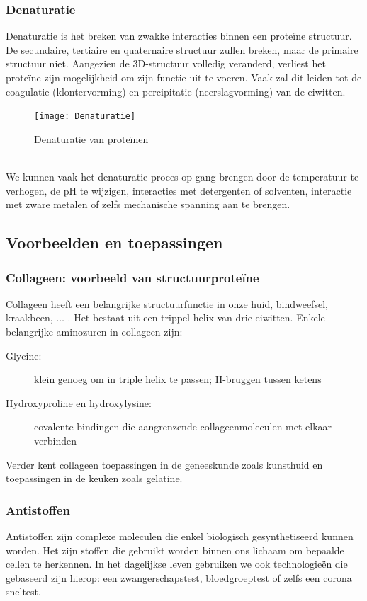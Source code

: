 \documentclass[a4paper,kul]{kulakarticle} %
\begin{document}
\subsubsection{Denaturatie} 
Denaturatie is het breken van zwakke interacties binnen een proteïne structuur. De secundaire, tertiaire en quaternaire structuur zullen breken, maar de primaire structuur niet. Aangezien de 3D-structuur volledig veranderd, verliest het proteïne zijn mogelijkheid om zijn functie uit te voeren. Vaak zal dit leiden tot de coagulatie (klontervorming) en percipitatie (neerslagvorming) van de eiwitten.
\begin{figure}[h]
	\centering
	\texttt{[image: Denaturatie]}
	\caption[Denaturatie]{Denaturatie van proteïnen}
	\label{fig:denaturatie}
\end{figure}\\
We kunnen vaak het denaturatie proces op gang brengen door de temperatuur te verhogen, de pH te wijzigen, interacties met detergenten of solventen, interactie met zware metalen of zelfs mechanische spanning aan te brengen. 
\newpage
\subsection{Voorbeelden en toepassingen}
\subsubsection{Collageen: voorbeeld van structuurproteïne}
Collageen heeft een belangrijke structuurfunctie in onze huid, bindweefsel, kraakbeen, $\ldots$ . Het bestaat uit een trippel helix van drie eiwitten. Enkele belangrijke aminozuren in collageen zijn:
\begin{description}
	\item[Glycine:] klein genoeg om in triple helix te
	passen; H-bruggen tussen ketens
	\item[Hydroxyproline en hydroxylysine:] covalente bindingen die aangrenzende collageenmoleculen met elkaar verbinden
\end{description}
Verder kent collageen toepassingen in de geneeskunde zoals kunsthuid en toepassingen in de keuken zoals gelatine. 
\subsubsection{Antistoffen}
Antistoffen zijn complexe moleculen die enkel biologisch gesynthetiseerd kunnen worden. Het zijn stoffen die gebruikt worden binnen ons lichaam om bepaalde cellen te herkennen. In het dagelijkse leven gebruiken we ook technologieën die gebaseerd zijn hierop: een zwangerschapstest, bloedgroeptest of zelfs een corona sneltest. 
\end{document}
